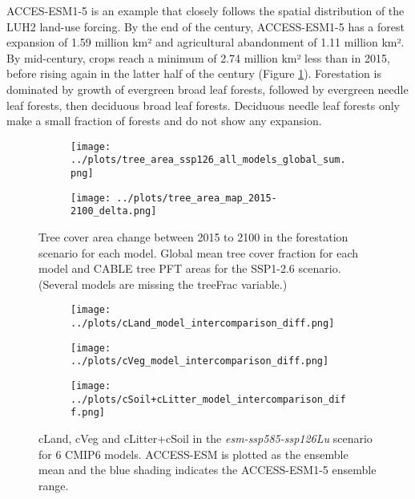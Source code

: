 \documentclass[]{article}
\begin{document}
ACCES-ESM1-5 is an example that closely follows the spatial distribution of the LUH2 land-use forcing.
By the end of the century, ACCESS-ESM1-5 has a forest expansion of 1.59 million km² and agricultural abandonment of 1.11 million km².
By mid-century, crops reach a minimum of 2.74 million km² less than in 2015, before rising again in the latter half of the century (Figure \ref{fig:land_use_map}).
Forestation is dominated by growth of evergreen broad leaf forests, followed by evergreen needle leaf forests, then deciduous broad leaf forests.
Deciduous needle leaf forests only make a small fraction of forests and do not show any expansion.

\begin{figure}[H]
    \centering
    \begin{subfigure}[b]{0.9\linewidth}
        \texttt{[image: ../plots/tree\_area\_ssp126\_all\_models\_global\_sum.png]}
    \end{subfigure}
    \begin{subfigure}[b]{0.9\linewidth}
        \texttt{[image: ../plots/tree\_area\_map\_2015-2100\_delta.png]}
    \end{subfigure}
    \caption{Tree cover area change between 2015 to 2100 in the forestation scenario for each model. Global mean tree cover fraction for each model and CABLE tree PFT areas for the SSP1-2.6 scenario. (Several models are missing the treeFrac variable.)}
    \label{fig:land_use_map}
\end{figure}

\begin{figure}[H]
    \centering
    \begin{subfigure}[b]{0.45\linewidth}
        \texttt{[image: ../plots/cLand\_model\_intercomparison\_diff.png]}
    \end{subfigure}
    \begin{subfigure}[b]{0.45\linewidth}
        \texttt{[image: ../plots/cVeg\_model\_intercomparison\_diff.png]}
    \end{subfigure}
    \begin{subfigure}[b]{0.45\linewidth}
        \texttt{[image: ../plots/cSoil+cLitter\_model\_intercomparison\_diff.png]}
    \end{subfigure}
    \caption{cLand, cVeg and cLitter+cSoil in the \textit{esm-ssp585-ssp126Lu} scenario for 6 CMIP6 models. ACCESS-ESM is plotted as the ensemble mean and the blue shading indicates the ACCESS-ESM1-5 ensemble range.}
    \label{fig:models_cpools}
\end{figure}
\end{document}
